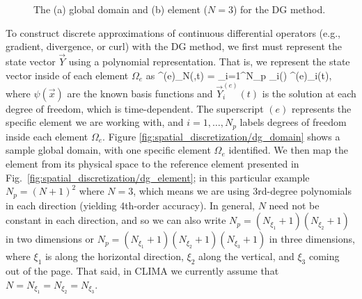 \documentclass{article}
\begin{document}
{\begin{figure}[htbp]
\begin{center}
\end{center}
\caption{The (a) global domain and (b) element ($N=3$) for the DG method.}
\label{fig:spatial_discretization/dg_method}
\end{figure}

To construct discrete approximations of continuous differential operators (e.g., gradient, divergence, or curl) with the DG method, we first must represent the state vector $\vec{Y}$ using a polynomial representation.  That is, we represent the state vector inside of each element $\Omega_e$ as
\be
{}^{(e)}_N(,t) = \sum_{i=1}^{N_p} \psi_i() ^{(e)}_i(t),
\label{eq:spatial_discretization/dg_method}
\ee
where $\psi(\vec{x})$ are the known basis functions and $\vec{Y}^{(e)}_i(t)$ is
the solution at each degree of freedom, which is time-dependent. The superscript
$(e)$ represents the specific element we are working with, and $i=1,\ldots,N_p$
labels degrees of freedom inside each element $\Omega_e$.  Figure
\ref{fig:spatial_discretization/dg_domain} shows a sample global domain, with
one specific element $\Omega_e$ identified.  We then map the element from its
physical space to the reference element presented in Fig.\
\ref{fig:spatial_discretization/dg_element}; in this particular example
$N_p=(N+1)^2$ where $N=3$, which means we are using 3rd-degree polynomials in
each direction (yielding 4th-order accuracy).  In general, $N$ need not be
constant in each direction, and so we can also write
$N_p=(N_{\xi_{1}}+1)(N_{\xi_{2}}+1)$ in two dimensions or
$N_p=(N_{\xi_{1}}+1)(N_{\xi_{2}}+1)(N_{\xi_{3}}+1)$ in three dimensions, where
$\xi_{1}$ is along the horizontal direction, $\xi_{2}$ along the vertical, and
$\xi_{3}$ coming out of the page. That said, in CLIMA we currently 
assume that $N = N_{\xi_{1}} = N_{\xi_{2}} = N_{\xi_{3}}$.

}
\end{document}
